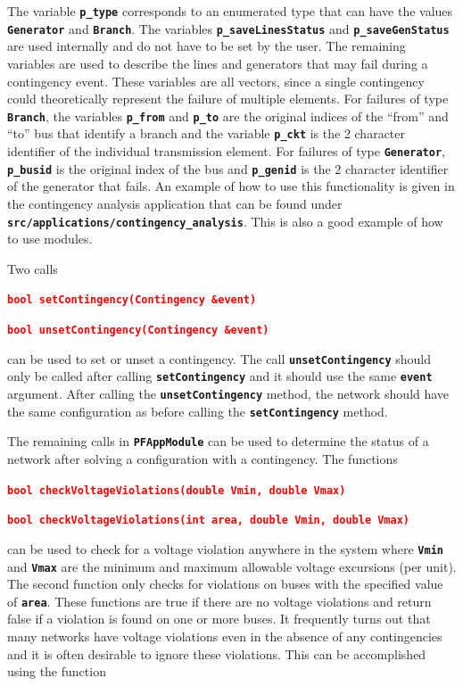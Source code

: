 \documentclass[12pt]{report} %
\begin{document}
The variable \texttt{\textbf{p\_type}} corresponds to an enumerated type that can have the values \texttt{\textbf{Generator}} and \texttt{\textbf{Branch}}. The variables \texttt{\textbf{p\_saveLinesStatus}} and \texttt{\textbf{p\_saveGenStatus}} are used internally and do not have to be set by the user. The remaining variables are used to describe the lines and generators that may fail during a contingency event. These variables are all vectors, since a single contingency could theoretically represent the failure of multiple elements. For failures of type \texttt{\textbf{Branch}}, the variables \texttt{\textbf{p\_from}} and \texttt{\textbf{p\_to}} are the original indices of the ``from'' and ``to'' bus that identify a branch and the variable \texttt{\textbf{p\_ckt}} is the 2 character identifier of the individual transmission element. For failures of type \texttt{\textbf{Generator}}, \texttt{\textbf{p\_busid}} is the original index of the bus and \texttt{\textbf{p\_genid}} is the 2 character identifier of the generator that fails. An example of how to use this functionality is given in the contingency analysis application that can be found under \texttt{\textbf{src/applications/contingency\_analysis}}. This is also a good example of how to use modules.

Two calls

\textcolor{red}{\texttt{\textbf{bool setContingency(Contingency \&event)}}}

\textcolor{red}{\texttt{\textbf{bool unsetContingency(Contingency \&event)}}}

can be used to set or unset a contingency. The call \texttt{\textbf{unsetContingency}} should only be called after calling \texttt{\textbf{setContingency}} and it should use the same \texttt{\textbf{event}} argument. After calling the \texttt{\textbf{unsetContingency}} method, the network should have the same configuration as before calling the \texttt{\textbf{setContingency}} method.

The remaining calls in \texttt{\textbf{PFAppModule}} can be used to determine the status of a network after solving a configuration with a contingency. The functions

\textcolor{red}{\texttt{\textbf{bool checkVoltageViolations(double Vmin, double Vmax)}}}

\textcolor{red}{\texttt{\textbf{bool checkVoltageViolations(int area, double Vmin, double Vmax)}}}

can be used to check for a voltage violation anywhere in the system where \texttt{\textbf{Vmin}} and \texttt{\textbf{Vmax}} are the minimum and maximum allowable voltage excursions (per unit). The second function only checks for violations on buses with the specified value of \texttt{\textbf{area}}. These functions are true if there are no voltage violations and return false if a violation is found on one or more buses. It frequently turns out that many networks have voltage violations even in the absence of any contingencies and it is often desirable to ignore these violations. This can be accomplished using the function
\end{document}
